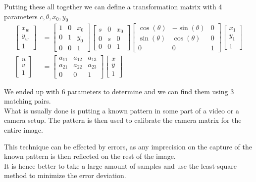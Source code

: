 \documentclass{article}
\begin{document}
Putting these all together we can define a transformation matrix with 4 parameters $c,\theta, x_0, y_0$
\begin{align*}
    \left[\begin{array}{c}x_w\\y_w\\ 1\end{array}\right] &= \left[\begin{array}{ccc}1 & 0 & x_0 \\ 0 & 1 & y_0 \\ 0&0&1\end{array}\right]\left[\begin{array}{ccc}s & 0 & x_0 \\ 0 & s & 0 \\ 0&0&1\end{array}\right]\left[\begin{array}{ccc}\cos(\theta) & -\sin(\theta) & 0 \\ \sin(\theta) & \cos(\theta) & 0 \\ 0&0&1\end{array}\right]\left[\begin{array}{c}x_1\\y_1\\1\end{array}\right]
    \\
    \left[\begin{array}{c}u \\ v \\ 1\end{array}\right] &= \left[\begin{array}{ccc}a_{11} & a_{12} & a_{13} \\ a_{21} & a_{22} & a_{23} \\ 0&0&1 \end{array}\right]\left[\begin{array}{c}x\\y\\1\end{array}\right]
\end{align*}

We ended up with 6 parameters to determine and we can find them using 3 matching pairs.\\
What is usually done is putting a known pattern in some part of a video or a camera setup. The pattern is then used to calibrate the camera matrix for the entire image.

This technique can be effected by errors, as any imprecision on the capture of the known pattern is then reflected on the rest of the image.\\
It is hence better to take a large amount of samples and use the least-square method to minimize the error deviation.
\end{document}
